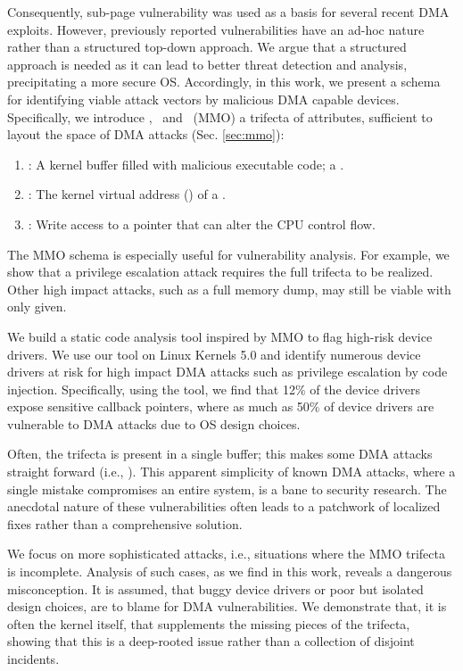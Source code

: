 Consequently, sub-page vulnerability was used as a basis for several recent DMA exploits. However, previously reported vulnerabilities have an ad-hoc nature \cite{thunder,MMT16,Ben17b} rather than a structured top-down approach. We argue that a structured approach is needed as it can lead to better threat detection and analysis, precipitating a more secure OS. Accordingly, in this work, we present a schema for identifying viable attack vectors by malicious DMA capable devices. Specifically, we introduce \means,~\motivation{} and \oportunity~(MMO) a trifecta of attributes, sufficient to layout the space of DMA attacks (Sec. \ref{sec:mmo}):
\begin{enumerate}
    \item \motivation: A kernel buffer filled with malicious executable code; a \mabaf.
    \item \means: The kernel virtual address (\kva) of a \mabaf.
    \item \oportunity: Write access to a pointer that can alter the CPU control flow.
\end{enumerate} 

The MMO schema is especially useful for vulnerability analysis. For example, we show that a privilege escalation attack requires the full trifecta to be realized. Other high impact attacks, such as a full memory dump, may still be viable with only \oportunity{} given. 

We build a static code analysis tool inspired by MMO to flag high-risk device drivers. We use our tool on Linux Kernels 5.0 and identify numerous device drivers at risk for high impact DMA attacks such as privilege escalation by code injection. Specifically, using the tool, we find that 12\% of the device drivers expose sensitive callback pointers, where as much as 50\% of device drivers are vulnerable to DMA attacks due to OS design choices.

Often, the trifecta is present in a single buffer; this makes some DMA attacks straight forward (i.e., \simple{}). This apparent simplicity of known DMA attacks, where a single mistake compromises an entire system, is a bane to security research. The anecdotal nature of these vulnerabilities often leads to a patchwork of localized fixes rather than a comprehensive solution. 

We focus on more sophisticated attacks, i.e., situations where the MMO trifecta is incomplete. Analysis of such cases, as we find in this work, reveals a dangerous misconception. It is assumed, that buggy device drivers or poor but isolated design choices, are to blame for DMA vulnerabilities. We demonstrate that, it is often the kernel itself, that supplements the missing pieces of the trifecta, showing that this is a deep-rooted issue rather than a collection of disjoint incidents.


